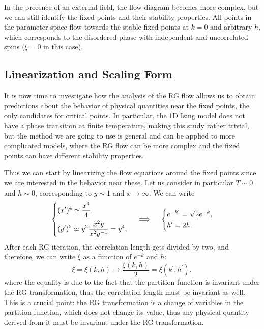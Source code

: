 In the precence of an external field, the flow diagram becomes more complex, but we can still identify the fixed points and their stability properties. All points in the parameter space flow towards the stable fixed points at \(k = 0\) and arbitrary \(h\), which corresponds to the disordered phase with independent and uncorrelated spins (\(\xi=0\) in this case).

\subsection{Linearization and Scaling Form}

It is now time to investigate how the analysis of the RG flow allows us to obtain predictions about the behavior of physical quantities near the fixed points, the only candidates for critical points. In particular, the 1D Ising model does not have a phase transition at finite temperature, making this study rather trivial, but the method we are going to use is general and can be applied to more complicated models, where the RG flow can be more complex and the fixed points can have different stability properties.

Thus we can start by linearizing the flow equations around the fixed points since we are interested in the behavior near these. Let us consider in particular \(T \sim 0\) and \(h \sim 0\), corresponding to \(y \sim 1\) and \(x \to \infty\). We can write
\[
    \begin{dcases}
        (x^{\prime})^4 \simeq \frac{x^4}{4}, \\
        (y^{\prime})^2 \simeq y^2 \frac{x^2 y}{x^2 y^{-1}} = y^4,
    \end{dcases} \quad \implies \quad \begin{dcases}
        e^{-k^{\prime}} = \sqrt{2} e^{-k}, \\
        h' = 2 h.
    \end{dcases}
\]
After each RG iteration, the correlation length gets divided by two, and therefore, we can write \(\xi\) as a function of \(e^{-k}\) and \(h\):
\[
    \xi = \xi(k,h) \to \frac{\xi(k,h)}{2} = \xi(k^{\prime}, h^{\prime}),
\]
where the equality is due to the fact that the partition function is invariant under the RG transformation, thus the correlation length must be invariant as well. This is a crucial point: the RG transformation is a change of variables in the partition function, which does not change its value, thus any physical quantity derived from it must be invariant under the RG transformation.

